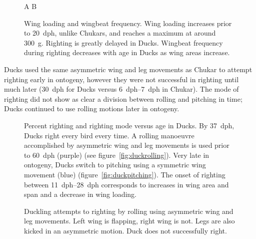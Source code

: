 \documentclass[10pt]{article}
\begin{document}
\begin{figure}
\begin{center}
A %
B %
\end{center}
\caption{Wing loading and wingbeat frequency. Wing loading increases prior to \SI{20}{dph}, unlike Chukars, and reaches a maximum at around \SI{300}{\gram}.  Righting is greatly delayed in Ducks.  Wingbeat frequency during righting decreases with age in Ducks as wing areas increase. }
\label{fig:duckfreq}
\end{figure}
	Ducks used the same asymmetric wing and leg movements as Chukar to attempt righting early in ontogeny, however they were not successful in righting until much later (\SI{30}{dph} for Ducks versus \SIrange{6}{7}{dph} in Chukar).  The mode of righting did not show as clear a division between rolling and pitching in time; Ducks continued to use rolling motions later in ontogeny.  
\begin{figure}
\begin{center}
\end{center}
\caption{Percent righting and righting mode versus age in Ducks.  By \SI{37}{dph}, Ducks right every bird every time.  A rolling manoeuvre accomplished by asymmetric wing and leg movements is used prior to \SI{60}{dph} (purple) (see figure~\ref{fig:duckrolling}).  Very late in ontogeny, Ducks switch to pitching using a symmetric wing movement (blue) (figure~\ref{fig:duckpitching}).  The onset of righting between \SIrange{11}{28}{dph} corresponds to increases in wing area and span and a decrease in wing loading.}
\label{fig:duckrighting1}
\end{figure}
\begin{figure}
\begin{center}
\end{center}
\caption{Duckling attempts to righting by rolling using asymmetric wing and leg movements.  Left wing is flapping, right wing is not.  Legs are also kicked in an asymmetric motion.  Duck does not successfully right.}
\label{fig:duckrollingfail}
\end{figure}
\end{document}
